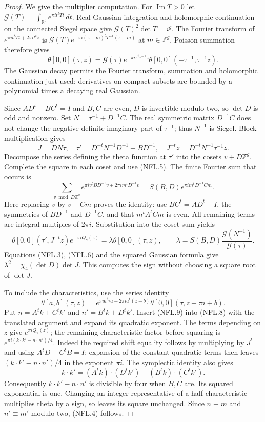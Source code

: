 \begin{proof}
We give the multiplier computation.  For $\operatorname{Im}T>0$ let
$\mathcal G(T)=\int_{\mathbb R^g}e^{\pi it^tTt}\,dt$.
Real Gaussian integration and holomorphic continuation on the
connected Siegel space give
$\mathcal G(T)^2\det T=i^g$.
The Fourier transform of $e^{\pi it^tTt+2\pi it^tz}$ is
$\mathcal G(T)e^{-\pi i(z-m)^tT^{-1}(z-m)}$ at $m\in\mathbb Z^g$.
Poisson summation therefore gives
\[
 \theta[0,0](\tau,z)=\mathcal G(\tau)
 e^{-\pi iz^t\tau^{-1}z}
 \theta[0,0](-\tau^{-1},\tau^{-1}z).
 \tag{NFL.5}
\]
The Gaussian decay permits the Fourier transform, summation and
holomorphic continuation just used; derivatives on compact subsets
are bounded by a polynomial times a decaying real Gaussian.

Since $AD^t-BC^t=I$ and $B,C$ are even, $D$ is invertible modulo
two, so $\det D$ is odd and nonzero.  Set
$N=\tau^{-1}+D^{-1}C$.  The real symmetric matrix $D^{-1}C$
does not change the negative definite imaginary part of $\tau^{-1}$;
thus $N^{-1}$ is Siegel.  Block multiplication gives
\[
 J=DN\tau,\quad
 \tau'=D^{-t}N^{-1}D^{-1}+BD^{-1},\quad
 J^{-t}z=D^{-t}N^{-1}\tau^{-1}z.
 \tag{NFL.6}
\]
Decompose the series defining the theta function at $\tau'$ into
the cosets $v+D\mathbb Z^g$.  Complete the square in each coset
and use (NFL.5).  The finite Fourier sum that occurs is
\[
 \sum_{v\bmod D\mathbb Z^g}
 e^{\pi iv^tBD^{-1}v+2\pi im^tD^{-1}v}
   =S(B,D)e^{\pi im^tD^{-1}Cm}.
 \tag{NFL.7}
\]
Here replacing $v$ by $v-Cm$ proves the identity: use
$BC^t=AD^t-I$, the symmetries of $BD^{-1}$ and $D^{-1}C$,
and that $m^tA^tCm$ is even.  All remaining terms are integral
multiples of $2\pi i$.  Substitution into the coset sum yields
\[
 \theta[0,0](\tau',J^{-t}z)e^{-\pi iQ_\gamma(z)}
   =\lambda\theta[0,0](\tau,z),\qquad
 \lambda=S(B,D)\frac{\mathcal G(N^{-1})}{\mathcal G(\tau)}.
 \tag{NFL.8}
\]
Equations (NFL.3), (NFL.6) and the squared Gaussian formula give
$\lambda^2=\chi_4(\det D)\det J$.  This computes the sign without
choosing a square root of $\det J$.

To include the characteristics, use the series identity
\[
 \theta[a,b](\tau,z)=
 e^{\pi ia^t\tau a+2\pi ia^t(z+b)}
 \theta[0,0](\tau,z+\tau a+b).
 \tag{NFL.9}
\]
Put $n=A^tk+C^tk'$ and $n'=B^tk+D^tk'$.
Insert (NFL.9) into (NFL.8) with the translated argument and
expand its quadratic exponent.  The terms depending on $z$ give
$e^{\pi iQ_\gamma(z)}$; the remaining characteristic factor before
squaring is $e^{\pi i(k\cdot k'-n\cdot n')/4}$.
Indeed the required shift equality follows by multiplying by
$J^t$ and using $A^tD-C^tB=I$; expansion of the constant
quadratic terms then leaves $(k\cdot k'-n\cdot n')/4$ in the
exponent $\pi i$.  The symplectic identity also gives
\[
 k\cdot k'=(A^tk)\cdot(D^tk')-(B^tk)\cdot(C^tk').
\]
Consequently $k\cdot k'-n\cdot n'$ is divisible by four when
$B,C$ are.  Its squared exponential is one.  Changing an integer
representative of a half-characteristic multiplies theta by a
sign, so leaves its square unchanged.  Since
$n\equiv m$ and $n'\equiv m'$ modulo two, (NFL.4) follows.
\end{proof}

